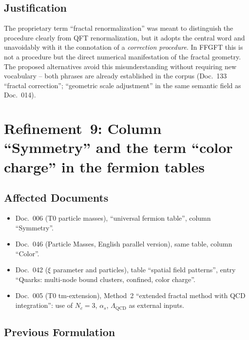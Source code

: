 \subsection*{Justification}

The proprietary term \enquote{fractal renormalization} was meant to
distinguish the procedure clearly from QFT renormalization, but it
adopts the central word and unavoidably with it the connotation of a
\emph{correction procedure}. In FFGFT this is not a procedure but
the direct numerical manifestation of the fractal geometry.
The proposed alternatives avoid this misunderstanding without
requiring new vocabulary -- both phrases are already established
in the corpus (Doc.~133 \enquote{fractal correction}; \enquote{geometric scale
adjustment} in the same semantic field as Doc.~014).

\section{\texorpdfstring{Refinement~9: Column \enquote{Symmetry} and the term \enquote{color charge} in the fermion tables}{Refinement 9: Column Symmetry and the term color charge in the fermion tables}}

\subsection*{Affected Documents}

\begin{itemize}
  \item Doc.~006 (T0 particle masses), \enquote{universal fermion table},
        column \enquote{Symmetry}.
  \item Doc.~046 (Particle Masses, English parallel version), same
        table, column \enquote{Color}.
  \item Doc.~042 ($\xi$ parameter and particles), table
        \enquote{spatial field patterns}, entry
        \enquote{Quarks: multi-node bound clusters, confined, color charge}.
  \item Doc.~005 (T0 tm-extension), Method~2 \enquote{extended fractal
        method with QCD integration}: use of $N_c = 3$,
        $\alpha_s$, $\Lambda_{\text{QCD}}$ as external inputs.
\end{itemize}

\subsection*{Previous Formulation}

